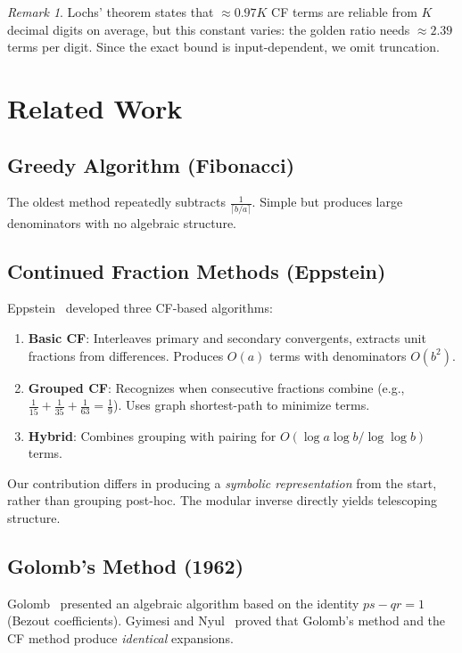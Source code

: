 \documentclass[11pt]{article}
\theoremstyle{definition}
\theoremstyle{remark}
\newtheorem{remark}[theorem]{Remark}
\begin{document}
\begin{remark}
Lochs' theorem states that $\approx 0.97K$ CF terms are reliable from $K$ decimal
digits on average, but this constant varies: the golden ratio needs $\approx 2.39$
terms per digit. Since the exact bound is input-dependent, we omit truncation.
\end{remark}

\section{Related Work}

\subsection{Greedy Algorithm (Fibonacci)}
The oldest method repeatedly subtracts $\frac{1}{\lceil b/a \rceil}$.
Simple but produces large denominators with no algebraic structure.

\subsection{Continued Fraction Methods (Eppstein)}
Eppstein~\cite{eppstein} developed three CF-based algorithms:
\begin{enumerate}
\item \textbf{Basic CF}: Interleaves primary and secondary convergents, extracts
      unit fractions from differences. Produces $O(a)$ terms with denominators $O(b^2)$.
\item \textbf{Grouped CF}: Recognizes when consecutive fractions combine
      (e.g., $\frac{1}{15} + \frac{1}{35} + \frac{1}{63} = \frac{1}{9}$).
      Uses graph shortest-path to minimize terms.
\item \textbf{Hybrid}: Combines grouping with pairing for $O(\log a \log b / \log\log b)$ terms.
\end{enumerate}

Our contribution differs in producing a \emph{symbolic representation} from the start,
rather than grouping post-hoc. The modular inverse directly yields telescoping structure.

\subsection{Golomb's Method (1962)}
Golomb~\cite{golomb} presented an algebraic algorithm based on the identity
$ps - qr = 1$ (Bezout coefficients). Gyimesi and Nyul~\cite{gyimesi} proved that
Golomb's method and the CF method produce \emph{identical} expansions.
\end{document}
